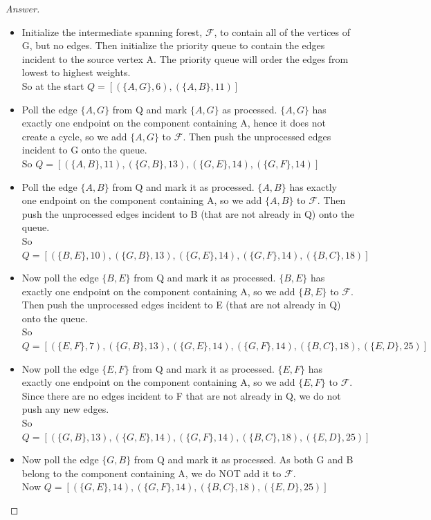 \documentclass[11pt]{article}
\theoremstyle{definition}
\theoremstyle{definition}
\theoremstyle{definition}
\begin{document}
\begin{proof}[Answer]

\begin{itemize}
\item Initialize the intermediate spanning forest, $\mathcal{F}$,  to contain all of the vertices of G, but no edges. Then initialize the priority queue to contain the edges incident to the source vertex A. The priority queue will order the edges from lowest to highest weights.\\
So at the start $Q= [ (\{A,G\}, 6), (\{A,B\}, 11) ]$ 
\item Poll the edge $\{A,G\}$ from Q and mark $\{A,G\}$ as processed. $\{A,G\}$ has exactly one endpoint on the component containing A, hence it does not create a cycle, so we add $\{A,G\}$ to $\mathcal{F}$. Then push the unprocessed edges incident to G onto the queue. \\
So $Q= [ (\{A,B\}, 11), (\{G,B\}, 13), (\{G,E\}, 14), (\{G,F\}, 14) ]$ 
\item Poll the edge $\{A,B\}$ from Q and mark it as processed. $\{A,B\}$ has exactly one endpoint on the component containing A, so we add $\{A,B\}$ to $\mathcal{F}$. Then push the unprocessed edges incident to B (that are not already in Q) onto the queue. \\
So $Q= [ (\{B,E\}, 10), (\{G,B\}, 13), (\{G,E\}, 14), (\{G,F\}, 14), (\{B,C\}, 18)]$ 
\item Now poll the edge $\{B,E\}$ from Q and mark it as processed. $\{B,E\}$ has exactly one endpoint on the component containing A, so we add $\{B,E\}$ to $\mathcal{F}$. Then push the unprocessed edges incident to E (that are not already in Q) onto the queue. \\
So $Q= [ (\{E,F\}, 7), (\{G,B\}, 13), (\{G,E\}, 14), (\{G,F\}, 14), (\{B,C\}, 18), (\{E,D\}, 25)]$ 
\item Now poll the edge $\{E,F\}$ from Q and mark it as processed. $\{E,F\}$ has exactly one endpoint on the component containing A, so we add $\{E,F\}$ to $\mathcal{F}$. Since there are no edges incident to F that are not already in Q, we do not push any new edges. \\
So $Q= [ (\{G,B\}, 13), (\{G,E\}, 14), (\{G,F\}, 14), (\{B,C\}, 18), (\{E,D\}, 25)]$ 
\item Now poll the edge $\{G,B\}$ from Q and mark it as processed. As both G and B belong to the component containing A, we do NOT add it to $\mathcal{F}$.\\
Now $Q= [ (\{G,E\}, 14), (\{G,F\}, 14), (\{B,C\}, 18), (\{E,D\}, 25)]$ 

\end{itemize}
\end{proof}
\end{document}
